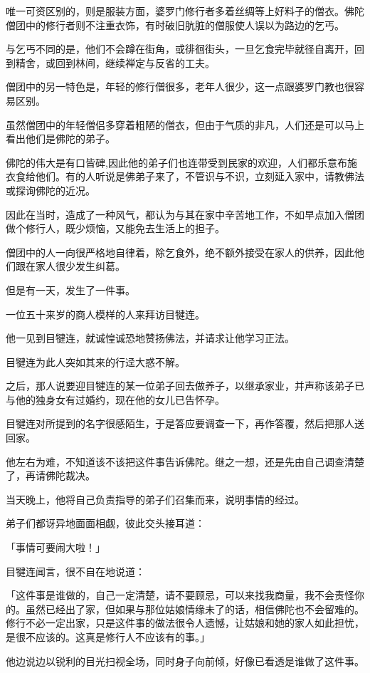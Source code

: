 \documentclass[twoside,openany]{book}
\begin{document}
唯一可资区别的，则是服装方面，婆罗门修行者多着丝绸等上好料子的僧衣。佛陀僧团中的修行者则不注重衣饰，有时破旧肮脏的僧服使人误以为路边的乞丐。

与乞丐不同的是，他们不会蹲在街角，或徘徊街头，一旦乞食完毕就径自离开，回到精舍，或回到林间，继续禅定与反省的工夫。

僧团中的另一特色是，年轻的修行僧很多，老年人很少，这一点跟婆罗门教也很容易区别。

虽然僧团中的年轻僧侣多穿着粗陋的僧衣，但由于气质的非凡，人们还是可以马上看出他们是佛陀的弟子。

佛陀的伟大是有口皆碑,因此他的弟子们也连带受到民家的欢迎，人们都乐意布施衣食给他们。有的人听说是佛弟子来了，不管识与不识，立刻延入家中，请教佛法或探询佛陀的近况。

因此在当时，造成了一种风气，都认为与其在家中辛苦地工作，不如早点加入僧团做个修行人，既少烦恼，又能免去生活上的担子。

僧团中的人一向很严格地自律着，除乞食外，绝不额外接受在家人的供养，因此他们跟在家人很少发生纠葛。

但是有一天，发生了一件事。

一位五十来岁的商人模样的人来拜访目犍连。







他一见到目犍连，就诚惶诚恐地赞扬佛法，并请求让他学习正法。

目犍连为此人突如其来的行迳大惑不解。

之后，那人说要迎目犍连的某一位弟子回去做养子，以继承家业，并声称该弟子已与他的独身女有过婚约，现在他的女儿已告怀孕。

目犍连对所提到的名字很感陌生，于是答应要调查一下，再作答覆，然后把那人送回家。

他左右为难，不知道该不该把这件事告诉佛陀。继之一想，还是先由自己调查清楚了，再请佛陀裁决。

当天晚上，他将自己负责指导的弟子们召集而来，说明事情的经过。

弟子们都讶异地面面相觑，彼此交头接耳道：

「事情可要闹大啦！」

目犍连闻言，很不自在地说道：

「这件事是谁做的，自己一定清楚，请不要顾忌，可以来找我商量，我不会责怪你的。虽然已经出了家，但如果与那位姑娘情缘未了的话，相信佛陀也不会留难的。修行不必一定出家，只是这件事的做法很令人遗憾，让姑娘和她的家人如此担忧，是很不应该的。这真是修行人不应该有的事。」

他边说边以锐利的目光扫视全场，同时身子向前倾，好像已看透是谁做了这件事。
\end{document}
